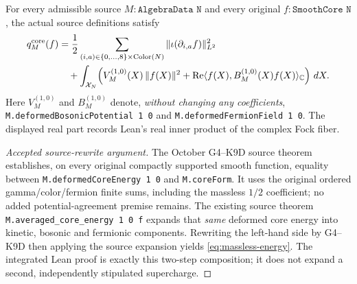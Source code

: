 \begin{theorem}\label{thm:massless-energy}
For every admissible source \(M:\texttt{AlgebraData N}\) and every original
\(f:\texttt{SmoothCore N}\), the actual source definitions satisfy
\begin{align}\label{eq:massless-energy}
 q_M^{\mathrm{core}}(f)
  &=\frac12\sum_{(i,a)\in\{0,\ldots,8\}\times\mathrm{Color}(N)}
     \|\iota(\partial_{i,a}f)\|_{L^2}^2 \\
  &\quad+\int_{\mathcal X_N}\!\left(
     V_M^{(1,0)}(X)\,\|f(X)\|^2
     +\operatorname{Re}\langle f(X),B_M^{(1,0)}(X)f(X)\rangle_{\mathbb C}
     \right)\,dX .\nonumber
\end{align}
Here \(V_M^{(1,0)}\) and \(B_M^{(1,0)}\) denote, \emph{without changing
any coefficients}, \texttt{M.deformedBosonicPotential 1 0} and
\texttt{M.deformedFermionField 1 0}. The displayed real part records
Lean's real inner product of the complex Fock fiber.
\end{theorem}
\begin{proof}[Accepted source-rewrite argument]
The October G4--K9D source theorem establishes, on every
original compactly supported smooth function, equality between
\texttt{M.deformedCoreEnergy 1 0} and \texttt{M.coreForm}. It uses the
original ordered gamma/color/fermion finite sums, including the massless
\(1/2\) coefficient; no added potential-agreement premise remains.
The existing source theorem \texttt{M.averaged\_core\_energy 1 0 f}
expands that \emph{same} deformed core energy into kinetic, bosonic and
fermionic components. Rewriting the left-hand side by G4--K9D then
applying the source expansion yields \eqref{eq:massless-energy}.
The integrated Lean proof is exactly this two-step composition; it does not
expand a second, independently stipulated supercharge.
\end{proof}

